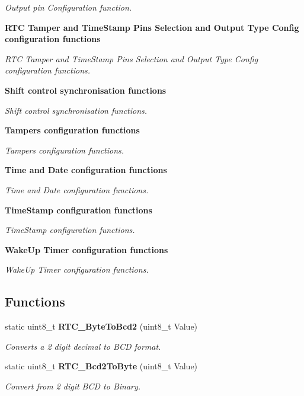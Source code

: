 \begin{DoxyCompactItemize}
\begin{DoxyCompactList}\small\item\em Output pin Configuration function. \end{DoxyCompactList}\item 
\textbf{ R\+T\+C Tamper and Time\+Stamp Pins Selection and Output Type Config configuration functions}
\begin{DoxyCompactList}\small\item\em R\+TC Tamper and Time\+Stamp Pins Selection and Output Type Config configuration functions. \end{DoxyCompactList}\item 
\textbf{ Shift control synchronisation functions}
\begin{DoxyCompactList}\small\item\em Shift control synchronisation functions. \end{DoxyCompactList}\item 
\textbf{ Tampers configuration functions}
\begin{DoxyCompactList}\small\item\em Tampers configuration functions. \end{DoxyCompactList}\item 
\textbf{ Time and Date configuration functions}
\begin{DoxyCompactList}\small\item\em Time and Date configuration functions. \end{DoxyCompactList}\item 
\textbf{ Time\+Stamp configuration functions}
\begin{DoxyCompactList}\small\item\em Time\+Stamp configuration functions. \end{DoxyCompactList}\item 
\textbf{ Wake\+Up Timer configuration functions}
\begin{DoxyCompactList}\small\item\em Wake\+Up Timer configuration functions. \end{DoxyCompactList}\end{DoxyCompactItemize}
\subsection*{Functions}
\begin{DoxyCompactItemize}
\item 
static uint8\+\_\+t \textbf{ R\+T\+C\+\_\+\+Byte\+To\+Bcd2} (uint8\+\_\+t Value)
\begin{DoxyCompactList}\small\item\em Converts a 2 digit decimal to B\+CD format. \end{DoxyCompactList}\item 
static uint8\+\_\+t \textbf{ R\+T\+C\+\_\+\+Bcd2\+To\+Byte} (uint8\+\_\+t Value)
\begin{DoxyCompactList}\small\item\em Convert from 2 digit B\+CD to Binary. \end{DoxyCompactList}\end{DoxyCompactItemize}



